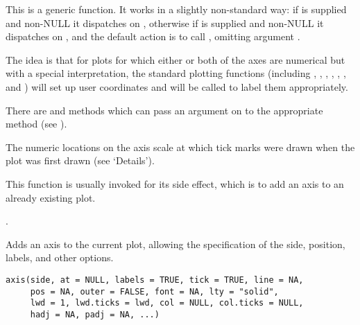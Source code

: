 %
\begin{Details}\relax
This is a generic function.  It works in a slightly non-standard way:
if  is supplied and non-NULL it dispatches on ,
otherwise if  is supplied and non-NULL it dispatches on ,
and the default action is to call , omitting argument
.

The idea is that for plots for which either or both of the axes are
numerical but with a special interpretation, the standard plotting
functions (including , ,
, ,
, ,  and
) will set up user coordinates and 
will be called to label them appropriately.

There are  and  methods which can pass an
argument  on to the appropriate  method (see
).
\end{Details}
%
\begin{Value}
The numeric locations on the axis scale at which tick marks were drawn
when the plot was first drawn (see `Details').

This function is usually invoked for its side effect, which is to add
an axis to an already existing plot.
\end{Value}
%
\begin{SeeAlso}\relax
{}.
\end{SeeAlso}
%
\begin{Description}\relax
Adds an axis to the current plot, allowing the
specification of the side, position, labels, and other options.
\end{Description}
%
\begin{Usage}
\begin{verbatim}
axis(side, at = NULL, labels = TRUE, tick = TRUE, line = NA,
     pos = NA, outer = FALSE, font = NA, lty = "solid",
     lwd = 1, lwd.ticks = lwd, col = NULL, col.ticks = NULL,
     hadj = NA, padj = NA, ...)
\end{verbatim}
\end{Usage}
%
